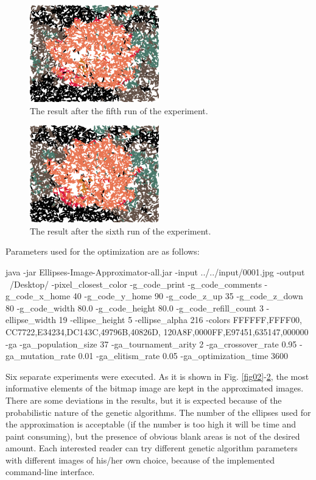 \documentclass[conference]{IEEEtran}
\begin{document}
\begin{figure}[htbp]
\centerline{\includegraphics[width=0.5\textwidth]{fig06.png}}
\caption{The result after the fifth run of the experiment.}
\label{fig06}
\end{figure}

\begin{figure}[htbp]
\centerline{\includegraphics[width=0.5\textwidth]{fig07.png}}
\caption{The result after the sixth run of the experiment.}
\label{fig07}
\end{figure}

Parameters used for the optimization are as follows:

\begin{verbnobox}[\small]
java -jar Ellipses-Image-Approximator-all.jar 
-input ../../input/0001.jpg -output ~/Desktop/ 
-pixel_closest_color -g_code_print 
-g_code_comments -g_code_x_home 40 
-g_code_y_home 90 -g_code_z_up 35 
-g_code_z_down 80 -g_code_width 80.0 
-g_code_height 80.0 -g_code_refill_count 3 
-ellipse_width 19 -ellipse_height 5 
-ellipse_alpha 216 -colors FFFFFF,FFFF00,
CC7722,E34234,DC143C,49796B,40826D,
120A8F,0000FF,E97451,635147,000000 -ga 
-ga_population_size 37 -ga_tournament_arity 2 
-ga_crossover_rate 0.95 -ga_mutation_rate 0.01 
-ga_elitism_rate 0.05 -ga_optimization_time 3600
\end{verbnobox}

Six separate experiments were executed. As it is shown in Fig. \ref{fig02}-\ref{fig07}, the most informative elements of the bitmap image are kept in the approximated images. There are some deviations in the results, but it is expected because of the probabilistic nature of the genetic algorithms. The number of the ellipses used for the approximation is acceptable (if the number is too high it will be time and paint consuming), but the presence of obvious blank areas is not of the desired amount. Each interested reader can try different genetic algorithm parameters with different images of his/her own choice, because of the implemented command-line interface. 
\end{document}
